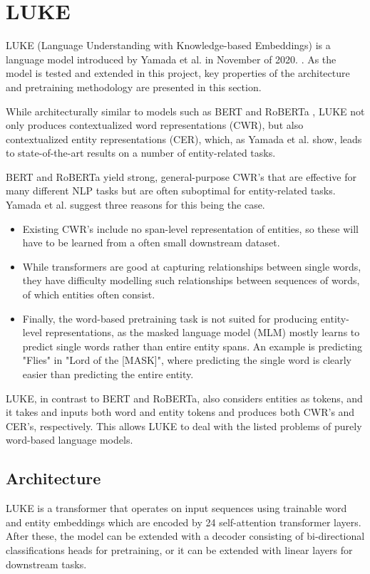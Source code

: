 \documentclass[main.tex]{subfiles}
\begin{document}
\section{LUKE}
LUKE (Language Understanding with Knowledge-based Embeddings) is a language model introduced by Yamada et al. in November of 2020. \cite{yamada2020luke}.
As the model is tested and extended in this project, key properties of the architecture and pretraining methodology are presented in this section.

While architecturally similar to models such as BERT \cite{devlin2019bert} and RoBERTa \cite{liu2019roberta}, LUKE not only produces contextualized word representations (CWR), but also contextualized entity representations (CER), which, as Yamada et al. show, leads to state-of-the-art results on a number of entity-related tasks.

BERT \cite{devlin2019bert} and RoBERTa \cite{liu2019roberta} yield strong, general-purpose CWR's that are effective for many different NLP tasks but are often suboptimal for entity-related tasks.
Yamada et al. suggest three reasons for this being the case.
\begin{itemize}
    \item Existing CWR's include no span-level representation of entities, so these will have to be learned from a often small downstream dataset.
    \item While transformers are good at capturing relationships between single words, they have difficulty modelling such relationships between sequences of words, of which entities often consist.
    \item Finally, the word-based pretraining task is not suited for producing entity-level representations, as the masked language model (MLM) mostly learns to predict single words rather than entire entity spans.
    An example is predicting "Flies" in "Lord of the [MASK]", where predicting the single word is clearly easier than predicting the entire entity.
\end{itemize}
LUKE, in contrast to BERT and RoBERTa, also considers entities as tokens, and it takes and inputs both word and entity tokens and produces both CWR's and CER's, respectively.
This allows LUKE to deal with the listed problems of purely word-based language models.

\subsection{Architecture}
LUKE is a transformer that operates on input sequences using trainable word and entity embeddings which are encoded by 24 self-attention transformer layers.
After these, the model can be extended with a decoder consisting of bi-directional classifications heads for pretraining, or it can be extended with linear layers for downstream tasks.
\end{document}

